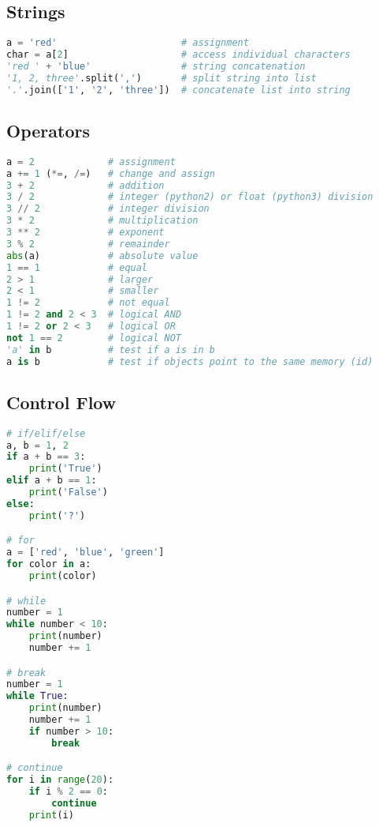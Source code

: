 \subsection{Strings}\label{strings}

\begin{lstlisting}[language=Python]
a = 'red'                      # assignment
char = a[2]                    # access individual characters
'red ' + 'blue'                # string concatenation
'1, 2, three'.split(',')       # split string into list
'.'.join(['1', '2', 'three'])  # concatenate list into string
\end{lstlisting}

\subsection{Operators}\label{operators}

\begin{lstlisting}[language=Python]
a = 2             # assignment
a += 1 (*=, /=)   # change and assign
3 + 2             # addition
3 / 2             # integer (python2) or float (python3) division
3 // 2            # integer division
3 * 2             # multiplication
3 ** 2            # exponent
3 % 2             # remainder
abs(a)            # absolute value
1 == 1            # equal
2 > 1             # larger
2 < 1             # smaller
1 != 2            # not equal
1 != 2 and 2 < 3  # logical AND
1 != 2 or 2 < 3   # logical OR
not 1 == 2        # logical NOT
'a' in b          # test if a is in b
a is b            # test if objects point to the same memory (id)
\end{lstlisting}

\subsection{Control Flow}\label{control-flow}

\begin{lstlisting}[language=Python]
# if/elif/else
a, b = 1, 2
if a + b == 3:
    print('True')
elif a + b == 1:
    print('False')
else:
    print('?')

# for
a = ['red', 'blue', 'green']
for color in a:
    print(color)

# while
number = 1
while number < 10:
    print(number)
    number += 1

# break
number = 1
while True:
    print(number)
    number += 1
    if number > 10:
        break

# continue
for i in range(20):
    if i % 2 == 0:
        continue
    print(i)
\end{lstlisting}

